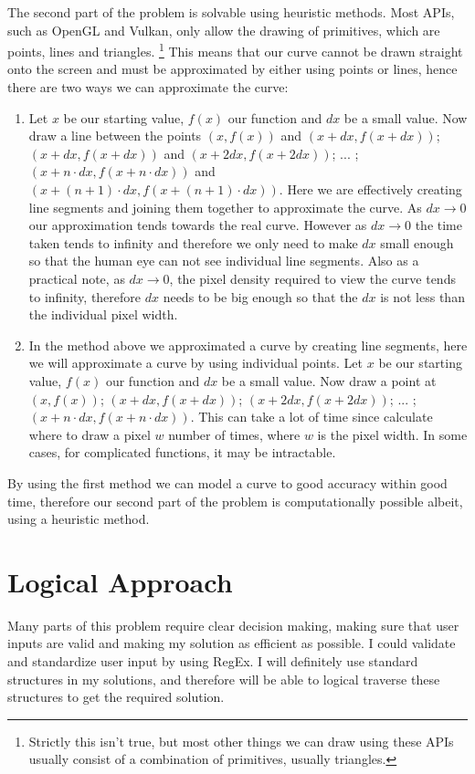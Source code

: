 \documentclass[../../../main.tex]{subfiles}
\begin{document}
The second part of the problem is solvable using heuristic methods. Most APIs, such as OpenGL and Vulkan, only allow the drawing of primitives, which are points, lines and triangles.
\footnote{Strictly this isn't true, but most other things we can draw using these APIs usually consist of a combination of primitives, usually triangles.} This means that our curve cannot be drawn straight onto the screen and must be approximated by either using points or lines, hence there are two ways we can approximate the curve:
\begin{enumerate}
\item Let $x$ be our starting value, $f(x)$ our function and $dx$ be a small value. Now draw a line between the points $(x,f(x))$ and $(x+dx,f(x+dx))$; $(x+dx,f(x+dx))$ and $(x+2dx,f(x+2dx))$; ... ;$(x+n\cdot dx,f(x+n\cdot dx))$ and $(x+(n+1)\cdot dx,f(x+(n+1)\cdot dx))$. Here we are effectively creating line segments and joining them together to approximate the curve. As $dx\to0$ our approximation tends towards the real curve. However as $dx\to0$ the time taken tends to infinity and therefore we only need to make $dx$ small enough so that the human eye can not see individual line segments. Also as a practical note, as $dx\to0$, the pixel density required to view the curve tends to infinity, therefore $dx$ needs to be big enough so that the $dx$ is not less than the individual pixel width.
\item In the method above we approximated a curve by creating line segments, here we will approximate a curve by using individual points. Let $x$ be our starting value, $f(x)$ our function and $dx$ be a small value. Now draw a point at $(x,f(x))$; $(x+dx,f(x+dx))$; $(x+2dx,f(x+2dx))$; ... ;$(x+n\cdot dx,f(x+n\cdot dx))$. This can take a lot of time since calculate where to draw a pixel $w$ number of times, where $w$ is the pixel width. In some cases, for complicated functions, it may be intractable.
\end{enumerate}
By using the first method we can model a curve to good accuracy within good time, therefore our second part of the problem is computationally possible albeit, using a heuristic method.
\newpage
\section{Logical Approach}
Many parts of this problem require clear decision making, making sure that user inputs are valid and making my solution as efficient as possible. I could validate and standardize user input by using RegEx. I will definitely use standard structures in my solutions, and therefore will be able to logical traverse these structures to get the required solution.
\end{document}
